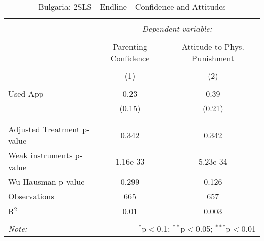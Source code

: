 
\begin{table}[!htbp] \centering 
  \caption{Bulgaria: 2SLS - Endline - Confidence and Attitudes} 
  \label{tbl:Bulgaria: 2SLS - Endline - Confidence and Attitudes} 
\begin{tabular}{@{\extracolsep{5pt}}lcc} 
\\[-1.8ex]\hline 
\hline \\[-1.8ex] 
 & \multicolumn{2}{c}{\textit{Dependent variable:}} \\ 
\cline{2-3} 
\\[-1.8ex] & Parenting Confidence & Attitude to Phys. Punishment \\ 
\\[-1.8ex] & (1) & (2)\\ 
\hline \\[-1.8ex] 
 Used App & 0.23 & 0.39 \\ 
  & (0.15) & (0.21) \\ 
  & & \\ 
\hline \\[-1.8ex] 
Adjusted Treatment p-value & 0.342 & 0.342 \\ 
Weak instruments p-value & 1.16e-33 & 5.23e-34 \\ 
Wu-Hausman p-value & 0.299 & 0.126 \\ 
Observations & 665 & 657 \\ 
R$^{2}$ & 0.01 & 0.003 \\ 
\hline 
\hline \\[-1.8ex] 
\textit{Note:}  & \multicolumn{2}{r}{$^{*}$p$<$0.1; $^{**}$p$<$0.05; $^{***}$p$<$0.01} \\ 
\end{tabular} 
\end{table} 
